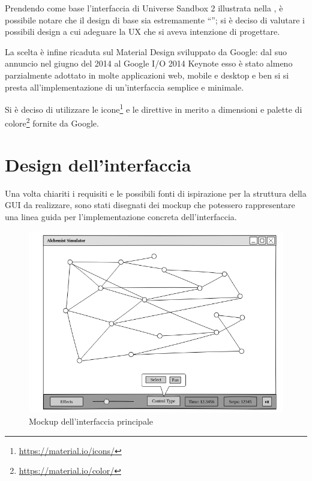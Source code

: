             Prendendo come base l'interfaccia di Universe Sandbox 2 illustrata nella , è possibile notare che il design di base sia estremamente ``''; si è deciso di valutare i possibili design a cui adeguare la UX che si aveva intenzione di progettare.

            La scelta è infine ricaduta sul Material Design sviluppato da Google: dal suo annuncio nel giugno del 2014 al Google I/O 2014 Keynote esso è stato almeno parzialmente adottato in molte applicazioni web, mobile e desktop e ben si si presta all'implementazione di un'interfaccia semplice e minimale.

            Si è deciso di utilizzare le icone\footnote{\url{https://material.io/icons/}} e le direttive in merito a dimensioni e palette di colore\footnote{\url{https://material.io/color/}} fornite da Google.

    \section{Design dell'interfaccia}\label{sec:design}
        Una volta chiariti i requisiti e le possibili fonti di ispirazione per la struttura della GUI da realizzare, sono stati disegnati dei mockup che potessero rappresentare una linea guida per l'implementazione concreta dell'interfaccia.

        \begin{figure}[htbp]
            \centering
            \includegraphics[scale=0.5]{img/withNodes/main_window}
            \caption{Mockup dell'interfaccia principale}
            \label{fig:mock:mainWindow}
        \end{figure}

